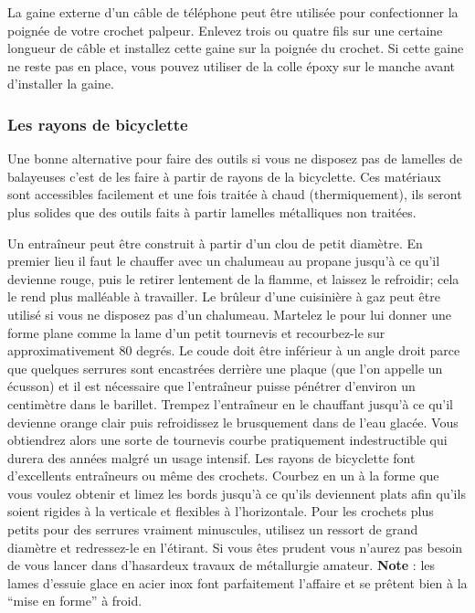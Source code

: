 \documentclass[a4paper,french,11pt,twoside]{report}
\begin{document}
La gaine externe d'un câble de téléphone peut être utilisée pour confectionner la poignée de votre crochet palpeur. Enlevez trois ou quatre fils sur une certaine longueur de câble et installez cette gaine sur la poignée du crochet. Si cette gaine ne reste pas en place, vous pouvez utiliser de la colle époxy sur le manche avant d'installer la gaine.

\subsubsection{Les rayons de bicyclette}
Une bonne alternative pour faire des outils si vous ne disposez pas de lamelles de balayeuses c'est de les faire à partir de rayons de la bicyclette. Ces matériaux sont accessibles facilement et une fois traitée à chaud (thermiquement), ils seront plus solides que des outils faits à partir lamelles métalliques non traitées.

Un entraîneur peut être construit à partir d'un clou de petit diamètre. En premier lieu il faut le chauffer avec un chalumeau au propane jusqu'à ce qu'il devienne rouge, puis le retirer lentement de la flamme, et laissez le refroidir; cela le rend plus malléable à travailler. Le brûleur d'une cuisinière à gaz peut être utilisé si vous ne disposez pas d'un chalumeau. Martelez le pour lui donner une forme plane comme la lame d'un petit tournevis et recourbez-le sur approximativement 80 degrés. Le coude doit être inférieur à un angle droit parce que quelques serrures sont encastrées derrière une plaque (que l'on appelle un écusson) et il est nécessaire que l'entraîneur puisse pénétrer d'environ un centimètre dans le barillet. Trempez l'entraîneur en le chauffant jusqu'à ce qu'il devienne orange clair puis refroidissez le brusquement dans de l'eau glacée. Vous obtiendrez alors une sorte de tournevis courbe pratiquement indestructible qui durera des années malgré un usage intensif.
Les rayons de bicyclette font d'excellents entraîneurs ou même des crochets. Courbez en un à la forme que vous voulez obtenir et limez les bords jusqu'à ce qu'ils deviennent plats afin qu'ils soient rigides à la verticale et flexibles à l'horizontale. Pour les crochets plus petits pour des serrures vraiment minuscules, utilisez un ressort de grand diamètre et redressez-le en l'étirant. Si vous êtes prudent vous n'aurez pas besoin de vous lancer dans d'hasardeux travaux de métallurgie amateur.
\medskip
\noindent \textbf{Note} : les lames d'essuie glace en acier inox font parfaitement l'affaire et se prêtent bien à la \enquote{mise en forme} à froid.
\end{document}
